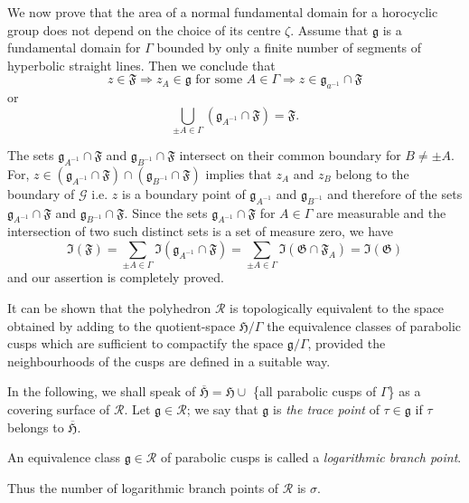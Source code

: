 We now prove that the area of a normal fundamental domain for a
horocyclic group does not depend on the choice of its centre
$\zeta$. Assume that $\mathfrak{g}$ is a fundamental domain for
$\Gamma$ bounded by only a finite number of segments of hyperbolic
straight lines. Then we conclude that 
$$
z \in \mathfrak{F} \Longrightarrow z_A \in
\mathfrak{g} \text{ for some } A \in \Gamma \Longrightarrow z
\in \mathfrak{g}_{a^{-1}} \cap \mathfrak{F}
$$
or
$$
\bigcup_{\pm A \in \Gamma} (\mathfrak{g}_{A^{-1}} \cap
\mathfrak{F}) = \mathfrak{F}.
$$

The sets $\mathfrak{g}_{A^{-1}}\cap \mathfrak{F}$ and
$\mathfrak{g}_{B^{-1}} \cap \mathfrak{F}$ intersect on their common
boundary for $B\neq \pm A$. For, $z\in (\mathfrak{g}_{A^{-1}}
\cap \mathfrak{F}) \cap (\mathfrak{g}_{B^{-1}} \cap \mathfrak{F})$
implies that $z_A$ and $z_B$ belong to the boundary of $\mathscr{G}$
i.e. $z$ is a boundary point of $\mathfrak{g}_{A^{-1}}$ and
$\mathfrak{g}_{B^{-1}}$ and therefore of the sets $\mathfrak{g}_{A^{-1}}
\cap \mathfrak{F}$ and $\mathfrak{g}_{B^{-1}} \cap \mathfrak{F}$. Since
the sets $\mathfrak{g}_{A^{-1}} \cap \mathfrak{F}$ for $A\in
\Gamma$ are measurable and the intersection of two such distinct sets
is a set of measure zero, we have
$$
\mathfrak{I} (\mathfrak{F}) = \sum_{\pm A \in \Gamma}
\mathfrak{I} (\mathfrak{g}_{A^{-1}} \cap \mathfrak{F}) = \sum_{\pm A
  \in \Gamma} \mathfrak{I} (\mathfrak{G} \cap\mathfrak{F}_A) =
\mathfrak{I} (\mathfrak{G})
$$
and our assertion is completely proved.

It can be shown that the polyhedron $\mathscr{R}$ is topologically
equivalent to the space obtained by adding to the quotient-space
$\mathfrak{H}/\Gamma$ the equivalence classes of parabolic cusps which
are sufficient to compactify the space $\mathfrak{g}/\Gamma$, provided
the neighbourhoods of the cusps are defined in a suitable way. 

In the \pageoriginale following, we shall speak of
$\overline{\mathfrak{H}} = \mathfrak{H} \cup$ \{all parabolic cusps of
$\Gamma$\} as a covering surface of $\mathscr{R}$. Let
$\mathfrak{g}\in \mathscr{R}$; we say that $\mathfrak{g}$ is
\textit{the trace point} of $\tau \in \mathfrak{g}$ if $\tau$
belongs to $\overline{\mathfrak{H}}$.

\begin{defi*}
An equivalence class $\mathfrak{g} \in \mathscr{R}$ of
parabolic cusps is called a \textit{logarithmic branch point}.
\end{defi*}

Thus the number of logarithmic branch points of $\mathscr{R}$ is $\sigma$.

